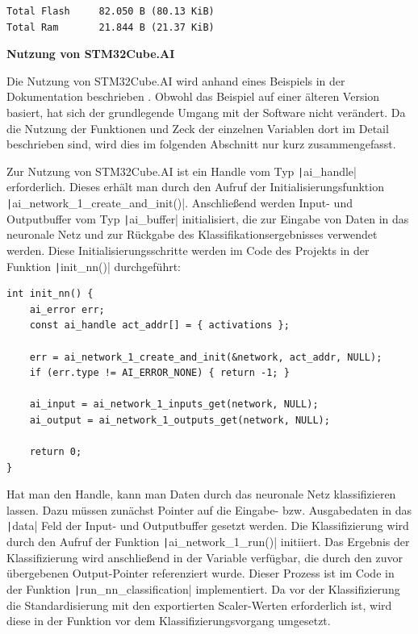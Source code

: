 \begin{verbatim}
Total Flash		82.050 B (80.13 KiB)
Total Ram  		21.844 B (21.37 KiB)
\end{verbatim}

\textbf{Nutzung von STM32Cube.AI}

Die Nutzung von STM32Cube.AI wird anhand eines Beispiels in der Dokumentation beschrieben \cite{stm32-cube-ai-documentation}. Obwohl das Beispiel auf einer älteren Version basiert, hat sich der grundlegende Umgang mit der Software nicht verändert. Da die Nutzung der Funktionen und Zeck der einzelnen Variablen dort im Detail  beschrieben sind, wird dies im folgenden Abschnitt nur kurz zusammengefasst.

Zur Nutzung von STM32Cube.AI ist ein Handle vom Typ \texttt|ai_handle| erforderlich. Dieses erhält man durch den Aufruf der Initialisierungsfunktion \texttt|ai_network_1_create_and_init()|. Anschließend werden Input- und Outputbuffer vom Typ \texttt|ai_buffer| initialisiert, die zur Eingabe von Daten in das neuronale Netz und zur Rückgabe des Klassifikationsergebnisses verwendet werden. Diese Initialisierungsschritte werden im Code des Projekts in der Funktion \texttt|init_nn()| durchgeführt:

\begin{verbatim}
int init_nn() {
	ai_error err;
	const ai_handle act_addr[] = { activations };

	err = ai_network_1_create_and_init(&network, act_addr, NULL);
	if (err.type != AI_ERROR_NONE) { return -1; }
	
	ai_input = ai_network_1_inputs_get(network, NULL);
	ai_output = ai_network_1_outputs_get(network, NULL);

	return 0;
}
\end{verbatim}

Hat man den Handle, kann man Daten durch das neuronale Netz klassifizieren lassen. Dazu müssen zunächst Pointer auf die Eingabe- bzw. Ausgabedaten in das \texttt|data| Feld der Input- und Outputbuffer gesetzt werden. Die Klassifizierung wird durch den Aufruf der Funktion \texttt|ai_network_1_run()| initiiert. Das Ergebnis der Klassifizierung wird anschließend in der Variable verfügbar, die durch den zuvor übergebenen Output-Pointer referenziert wurde. Dieser Prozess ist im Code in der Funktion \texttt|run_nn_classification| implementiert. Da vor der Klassifizierung die Standardisierung mit den exportierten Scaler-Werten erforderlich ist, wird diese in der Funktion vor dem Klassifizierungsvorgang umgesetzt.

